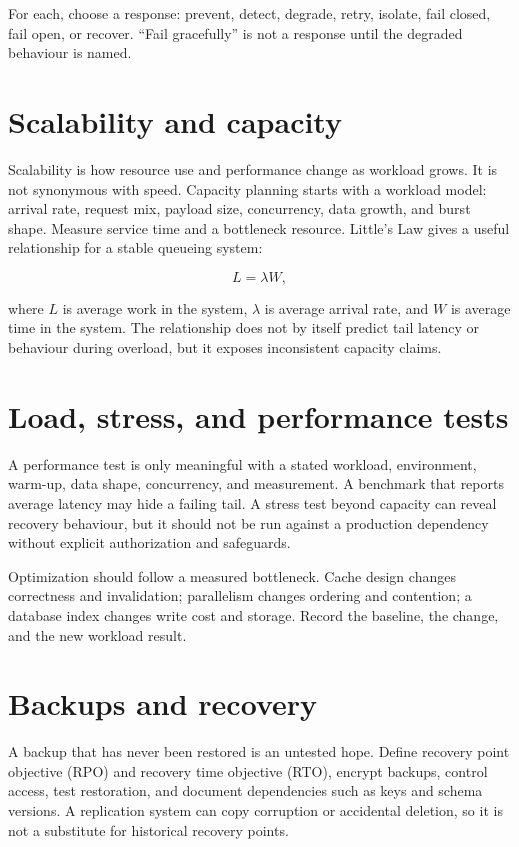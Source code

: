 For each, choose a response: prevent, detect, degrade, retry, isolate, fail
closed, fail open, or recover. “Fail gracefully” is not a response until the
degraded behaviour is named.

\section{Scalability and capacity}
Scalability is how resource use and performance change as workload grows. It is
not synonymous with speed. Capacity planning starts with a workload model:
arrival rate, request mix, payload size, concurrency, data growth, and burst
shape. Measure service time and a bottleneck resource. Little's Law gives a
useful relationship for a stable queueing system:

\[
  L = \lambda W,
\]

where $L$ is average work in the system, $\lambda$ is average arrival rate, and
$W$ is average time in the system. The relationship does not by itself predict
tail latency or behaviour during overload, but it exposes inconsistent capacity
claims.

\section{Load, stress, and performance tests}
A performance test is only meaningful with a stated workload, environment,
warm-up, data shape, concurrency, and measurement. A benchmark that reports
average latency may hide a failing tail. A stress test beyond capacity can reveal
recovery behaviour, but it should not be run against a production dependency
without explicit authorization and safeguards.

Optimization should follow a measured bottleneck. Cache design changes
correctness and invalidation; parallelism changes ordering and contention; a
database index changes write cost and storage. Record the baseline, the change,
and the new workload result.

\section{Backups and recovery}
A backup that has never been restored is an untested hope. Define recovery point
objective (RPO) and recovery time objective (RTO), encrypt backups, control
access, test restoration, and document dependencies such as keys and schema
versions. A replication system can copy corruption or accidental deletion, so it
is not a substitute for historical recovery points.

